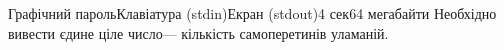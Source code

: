 \begin{problem}{Графічний пароль}{Клавіатура (stdin)}{Екран (stdout)}{4 сек}{64 мегабайти}
\OutputFile
Необхідно вивести єдине ціле число\nolinebreak[3] --- кількість самоперетинів у\nolinebreak[3] ламаній.

\ifAfour\else
\vspace{-0.875\baselineskip plus 0.25 ex}
\fi

{\Examples\makeTableLongfalse
%
%
\begin{exampleSimple}{5em}{3em}%
%
\end{exampleSimple}
\begin{exampleSimple}{5em}{3em}%
%
\end{exampleSimple}

}

\end{problem}

